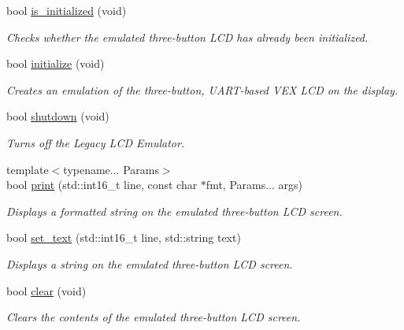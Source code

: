 \begin{DoxyCompactItemize}
\item 
bool \mbox{\hyperlink{namespacepros_1_1lcd_a867eb9cd989e1c6c31982fe2b5c58dd9}{is\+\_\+initialized}} (void)
\begin{DoxyCompactList}\small\item\em Checks whether the emulated three-\/button L\+CD has already been initialized. \end{DoxyCompactList}\item 
bool \mbox{\hyperlink{namespacepros_1_1lcd_afb69bfa2fc5da3018b6886f612ed190e}{initialize}} (void)
\begin{DoxyCompactList}\small\item\em Creates an emulation of the three-\/button, U\+A\+R\+T-\/based V\+EX L\+CD on the display. \end{DoxyCompactList}\item 
bool \mbox{\hyperlink{namespacepros_1_1lcd_a7aa9a422049011de193f54bce8cc95ed}{shutdown}} (void)
\begin{DoxyCompactList}\small\item\em Turns off the Legacy L\+CD Emulator. \end{DoxyCompactList}\item 
{\footnotesize template$<$typename... Params$>$ }\\bool \mbox{\hyperlink{namespacepros_1_1lcd_aead67d10b420308d58883135f0d28099}{print}} (std\+::int16\+\_\+t line, const char $\ast$fmt, Params... args)
\begin{DoxyCompactList}\small\item\em Displays a formatted string on the emulated three-\/button L\+CD screen. \end{DoxyCompactList}\item 
bool \mbox{\hyperlink{namespacepros_1_1lcd_a515526f1d3069a6aa985512273aa7788}{set\+\_\+text}} (std\+::int16\+\_\+t line, std\+::string text)
\begin{DoxyCompactList}\small\item\em Displays a string on the emulated three-\/button L\+CD screen. \end{DoxyCompactList}\item 
bool \mbox{\hyperlink{namespacepros_1_1lcd_a8d22379bd680a36182d51d8e8ef02baf}{clear}} (void)
\begin{DoxyCompactList}\small\item\em Clears the contents of the emulated three-\/button L\+CD screen. \end{DoxyCompactList}\item 

\end{DoxyCompactItemize}
